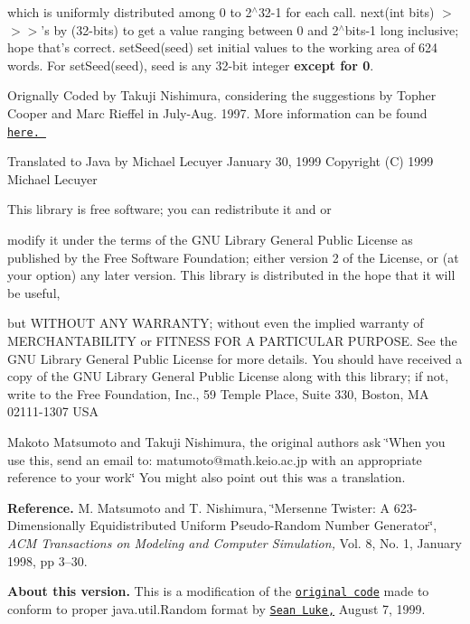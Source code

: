 which is uniformly distributed among 0 to 2$^\wedge$32-\/1 for each call. next(int bits) $>$$>$$>$'s by (32-\/bits) to get a value ranging between 0 and 2$^\wedge$bits-\/1 long inclusive; hope that's correct. set\-Seed(seed) set initial values to the working area of 624 words. For set\-Seed(seed), seed is any 32-\/bit integer {\bfseries except for 0}.

Orignally Coded by Takuji Nishimura, considering the suggestions by Topher Cooper and Marc Rieffel in July-\/\-Aug. 1997. More information can be found \href{http://www.math.keio.ac.jp/matumoto/emt.html}{\tt here. }

Translated to Java by Michael Lecuyer January 30, 1999 Copyright (C) 1999 Michael Lecuyer 

This library is free software; you can redistribute it and or

modify it under the terms of the G\-N\-U Library General Public License as published by the Free Software Foundation; either version 2 of the License, or (at your option) any later version. This library is distributed in the hope that it will be useful,

but W\-I\-T\-H\-O\-U\-T A\-N\-Y W\-A\-R\-R\-A\-N\-T\-Y; without even the implied warranty of M\-E\-R\-C\-H\-A\-N\-T\-A\-B\-I\-L\-I\-T\-Y or F\-I\-T\-N\-E\-S\-S F\-O\-R A P\-A\-R\-T\-I\-C\-U\-L\-A\-R P\-U\-R\-P\-O\-S\-E. See the G\-N\-U Library General Public License for more details. You should have received a copy of the G\-N\-U Library General Public License along with this library; if not, write to the Free Foundation, Inc., 59 Temple Place, Suite 330, Boston, M\-A 02111-\/1307 U\-S\-A 

Makoto Matsumoto and Takuji Nishimura, the original authors ask \char`\"{}\-When you use this, send an email to\-: matumoto@math.\-keio.\-ac.\-jp
with an appropriate reference to your work\char`\"{} You might also point out this was a translation. 

{\bfseries Reference. } M. Matsumoto and T. Nishimura, \char`\"{}\-Mersenne Twister\-: A 623-\/\-Dimensionally Equidistributed Uniform
\-Pseudo-\/\-Random Number Generator\char`\"{}, {\itshape A\-C\-M Transactions on Modeling and Computer Simulation,} Vol. 8, No. 1, January 1998, pp 3--30.

{\bfseries About this version. } This is a modification of the \href{http://www.theorem.com/java/index.htm#Mersenne}{\tt original code} made to conform to proper java.\-util.\-Random format by \href{http://www.cs.umd.edu/users/seanl/}{\tt Sean Luke,} August 7, 1999.


